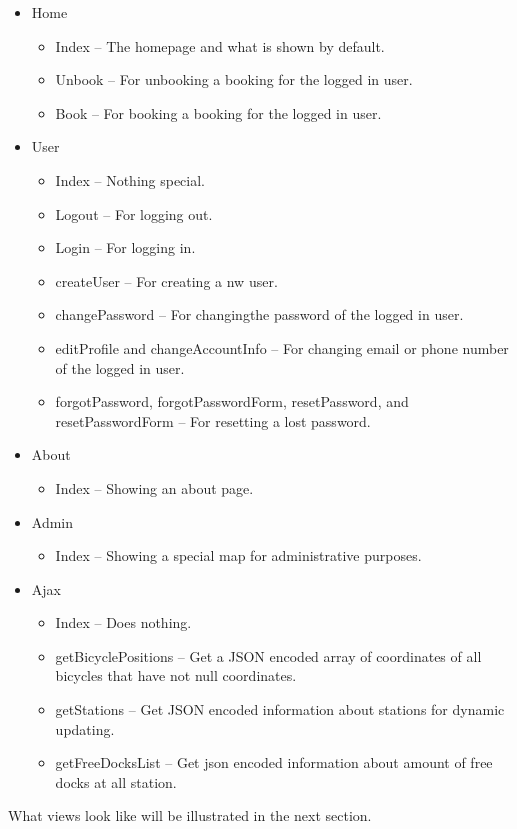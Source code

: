 \begin{itemize}
\item Home {\begin{itemize} 
            \item Index -- The homepage and what is shown by default.
            \item Unbook -- For unbooking a booking for the logged in user.
            \item Book -- For booking a booking for the logged in user.
            \end{itemize}}
\item User {\begin{itemize} 
            \item Index -- Nothing special.
            \item Logout -- For logging out.
            \item Login -- For logging in.
            \item createUser -- For creating a nw user.
            \item changePassword -- For changingthe password of the logged in user.
            \item editProfile and changeAccountInfo -- For changing email or phone number of the logged in user.
            \item forgotPassword, forgotPasswordForm, resetPassword, and resetPasswordForm -- For resetting a lost password.
            \end{itemize}}
\item About {\begin{itemize} 
            \item Index -- Showing an about page.
            \end{itemize}}
\item Admin {\begin{itemize} 
            \item Index -- Showing a special map for administrative purposes.
            \end{itemize}}
\item Ajax {\begin{itemize} 
            \item Index -- Does nothing.
            \item getBicyclePositions -- Get a JSON encoded array of coordinates of all bicycles that have not null coordinates.
            \item getStations -- Get JSON encoded information about stations for dynamic updating.
            \item getFreeDocksList -- Get json encoded information about amount of free docks at all station.
            \end{itemize}}
\end{itemize}

What views look like will be illustrated in the next section.